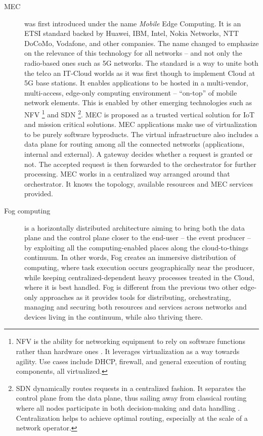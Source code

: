 \documentclass[11pt]{sdm}
\begin{document}
\begin{description}
	\item[\acrfull{MEC}] was first introduced under the name \emph{Mobile} Edge Computing. It is an \gls{ETSI} standard backed by Huawei, IBM, Intel, Nokia Networks, NTT DoCoMo, Vodafone, and other companies. The name changed to emphasize on the relevance of this technology for all networks -- and not only the radio-based ones such as 5G networks. The standard is a way to unite both the telco an IT-Cloud worlds \cite{dahmen-lhuissier_etsi_nodate-1} as it was first though to implement Cloud at 5G base stations. It enables applications to be hosted in a multi-vendor, multi-access, edge-only computing environment -- ``on-top'' of mobile network elements. This is enabled by other emerging technologies such as \gls{NFV} \footnote{\acrfull{NFV} is the ability for networking equipment to rely on software functions rather than hardware ones \cite{redhat_what_2019}. It leverages virtualization as a way towards agility. Use cases include DHCP, firewall, and general execution of routing components, all virtualized.} and \gls{SDN} \footnote{\acrfull{SDN} dynamically routes requests in a centralized fashion. It separates the control plane from the data plane, thus sailing away from classical routing where all nodes participate in both decision-making and data handling \cite{redhat_what_2019}. Centralization helps to achieve optimal routing, especially at the scale of a network operator.}. \gls{MEC} is proposed as a trusted vertical solution for \gls{IoT} and mission critical solutions. \gls{MEC} applications make use of virtualization to be purely software byproducts. The virtual infrastructure also includes a data plane for routing among all the connected networks (applications, internal and external). A gateway decides whether a request is granted or not. The accepted request is then forwarded to the orchestrator for further processing. \gls{MEC} works in a centralized way arranged around that orchestrator. It knows the topology, available resources and \gls{MEC} services provided.

	\item[Fog computing] is a horizontally distributed architecture aiming to bring both the data plane and the control plane closer to the end-user -- the event producer -- by exploiting all the computing-enabled places along the cloud-to-things continuum. In other words, Fog creates an immersive distribution of computing, where task execution occurs geographically near the producer, while keeping centralized-dependent heavy processes treated in the Cloud, where it is best handled. Fog is different from the previous two other edge-only approaches as it provides tools for distributing, orchestrating, managing and securing both resources and services across networks and devices living in the continuum, while also thriving there.


\end{description}
\end{document}
